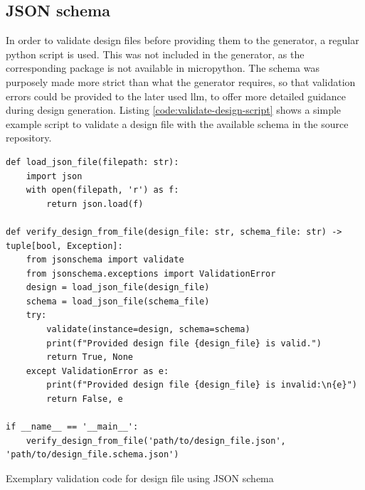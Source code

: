 \documentclass[Bachelor, BIC, english, fhCitStyle, IEEE]{BASE/twbook} %
\begin{document}
\subsection{JSON schema}
In order to validate design files before providing them to the generator, a regular python script is used. This was not included in the generator, as the corresponding package is not available in micropython. The schema was purposely made more strict than what the generator requires, so that validation errors could be provided to the later used \ac{llm}, to offer more detailed guidance during design generation.
Listing \ref{code:validate-design-script} shows a simple example script to validate a design file with the available schema in the source repository.
\begin{listing}[htbp]
    \begin{verbatim}
def load_json_file(filepath: str):
    import json
    with open(filepath, 'r') as f:
        return json.load(f)

def verify_design_from_file(design_file: str, schema_file: str) -> tuple[bool, Exception]:
    from jsonschema import validate
    from jsonschema.exceptions import ValidationError
    design = load_json_file(design_file)
    schema = load_json_file(schema_file)
    try:
        validate(instance=design, schema=schema)
        print(f"Provided design file {design_file} is valid.")
        return True, None
    except ValidationError as e:
        print(f"Provided design file {design_file} is invalid:\n{e}")
        return False, e

if __name__ == '__main__':
    verify_design_from_file('path/to/design_file.json', 'path/to/design_file.schema.json')
    \end{verbatim}
    \caption{Exemplary validation code for design file using JSON schema}
    \label{code:validate-design-script}
\end{listing}
\clearpage
\end{document}
